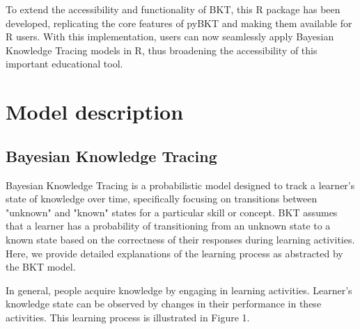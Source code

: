 \documentclass{article}
\begin{document}
To extend the accessibility and functionality of BKT, this R package has been developed, replicating the core features of pyBKT and making them available for R users. With this implementation, users can now seamlessly apply Bayesian Knowledge Tracing models in R, thus broadening the accessibility of this important educational tool.

\section{Model description}

\subsection{Bayesian Knowledge Tracing}
Bayesian Knowledge Tracing is a probabilistic model designed to track a learner’s state of knowledge over time, specifically focusing on transitions between "unknown" and "known" states for a particular skill or concept. BKT assumes that a learner has a probability of transitioning from an unknown state to a known state based on the correctness of their responses during learning activities. Here, we provide detailed explanations of the learning process as abstracted by the BKT model.

In general, people acquire knowledge by engaging in learning activities. Learner's knowledge state can be observed by changes in their performance in these activities. This learning process is illustrated in Figure 1.

\begin{center}
\end{center}
\end{document}
